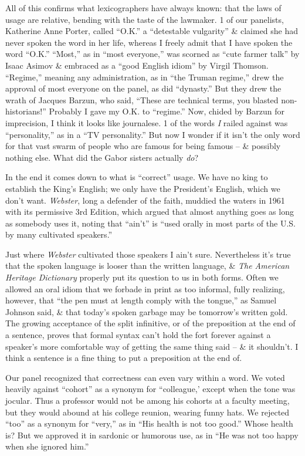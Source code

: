 \documentclass{article}
\begin{document}
All of this confirms what lexicographers have always known: that the laws of usage are relative, bending with the taste of the lawmaker. 1 of our panelists, Katherine Anne Porter, called ``O.K.'' a ``detestable vulgarity'' \& claimed she had never spoken the word in her life, whereas I freely admit that I have spoken the word ``O.K.'' ``Most,'' as in ``most everyone,'' was scorned as ``cute farmer talk'' by Isaac Asimov \& embraced as a ``good English idiom'' by Virgil Thomson. ``Regime,'' meaning any administration, as in ``the Truman regime,'' drew the approval of most everyone on the panel, as did ``dynasty.'' But they drew the wrath of Jacques Barzun, who said, ``These are technical terms, you blasted non-historians!'' Probably I gave my O.K. to ``regime.'' Now, chided by Barzun for imprecision, I think it looks like journalese. 1 of the words \textit{I} railed against was ``personality,'' as in a ``TV personality.'' But now I wonder if it isn't the only word for that vast swarm of people who are famous for being famous -- \& possibly nothing else. What did the Gabor sisters actually \textit{do}?

In the end it comes down to what is ``correct'' usage. We have no king to establish the King's English; we only have the President's English, which we don't want. \textit{Webster}, long a defender of the faith, muddied the waters in 1961 with its permissive 3rd Edition, which argued that almost anything goes as long as somebody uses it, noting that ``ain't'' is ``used orally in most parts of the U.S. by many cultivated speakers.''

Just where \textit{Webster} cultivated those speakers I ain't sure. Nevertheless it's true that the spoken language is looser than the written language, \& \textit{The American Heritage Dictionary} properly put its question to us in both forms. Often we allowed an oral idiom that we forbade in print as too informal, fully realizing, however, that ``the pen must at length comply with the tongue,'' as Samuel Johnson said, \& that today's spoken garbage may be tomorrow's written gold. The growing acceptance of the split infinitive, or of the preposition at the end of a sentence, proves that formal syntax can't hold the fort forever against a speaker's more comfortable way of getting the same thing said -- \& it shouldn't. I think a sentence is a fine thing to put a preposition at the end of.

Our panel recognized that correctness can even vary within a word. We voted heavily against ``cohort'' as a synonym for ``colleague,' except when the tone was jocular. Thus a professor would not be among his cohorts at a faculty meeting, but they would abound at his college reunion, wearing funny hats. We rejected ``too'' as a synonym for ``very,'' as in ``His health is not too good.'' Whose health is? But we approved it in sardonic or humorous use, as in ``He was not too happy when she ignored him.''
\end{document}
